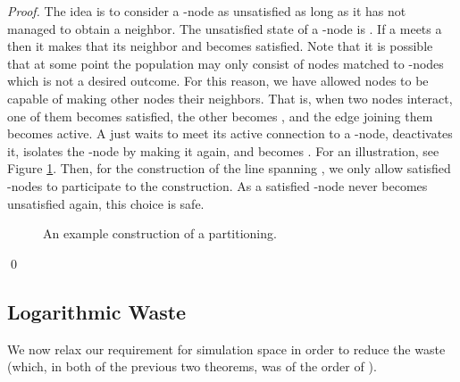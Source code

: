 \documentclass[oribibl, 11pt]{llncs}
\begin{document}
\begin{proof}
The idea is to consider a -node as unsatisfied as long as it has not managed to obtain a  neighbor. The unsatisfied state of a -node is . If a  meets a  then it makes that  its  neighbor and becomes satisfied. Note that it is possible that at some point the population may only consist of  nodes matched to -nodes which is not a desired outcome. For this reason, we have allowed  nodes to be capable of making other  nodes their  neighbors. That is, when two  nodes interact, one of them becomes satisfied, the other becomes , and the edge joining them becomes active. A  just waits to meet its active connection to a -node, deactivates it, isolates the -node by making it  again, and becomes . For an illustration, see Figure \ref{fig:gencon-three-sets}. Then, for the construction of the line spanning , we only allow satisfied -nodes to participate to the construction. As a satisfied -node never becomes unsatisfied again, this choice is safe.

\begin{figure}[!hbtp]
\caption{An example construction of a  partitioning.} \label{fig:gencon-three-sets}
\end{figure}
\qed
\end{proof}

\subsection{Logarithmic Waste}

We now relax our requirement for simulation space in order to reduce the waste (which, in both of the previous two theorems, was of the order of ).
\end{document}
